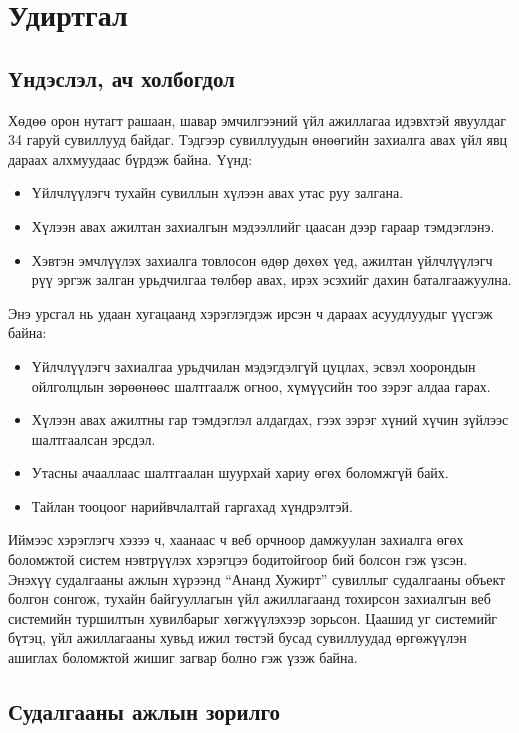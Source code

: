 \chapter{Удиртгал}

\section{Үндэслэл, ач холбогдол}

Хөдөө орон нутагт рашаан, шавар эмчилгээний үйл ажиллагаа идэвхтэй явуулдаг 34 гаруй сувиллууд байдаг. Тэдгээр сувиллуудын өнөөгийн захиалга авах үйл явц дараах алхмуудаас бүрдэж байна. Үүнд:

\begin{itemize}
    \item Үйлчлүүлэгч тухайн сувиллын хүлээн авах утас руу залгана.
    \item Хүлээн авах ажилтан захиалгын мэдээллийг цаасан дээр гараар тэмдэглэнэ.
    \item Хэвтэн эмчлүүлэх захиалга товлосон өдөр дөхөх үед, ажилтан үйлчлүүлэгч рүү эргэж залган урьдчилгаа төлбөр авах, ирэх эсэхийг дахин баталгаажуулна.
\end{itemize}

Энэ урсгал нь удаан хугацаанд хэрэглэгдэж ирсэн ч дараах асуудлуудыг үүсгэж байна:

\begin{itemize}
    \item Үйлчлүүлэгч захиалгаа урьдчилан мэдэгдэлгүй цуцлах, эсвэл хоорондын ойлголцлын зөрөөнөөс шалтгаалж огноо, хүмүүсийн тоо зэрэг алдаа гарах.
    \item Хүлээн авах ажилтны гар тэмдэглэл алдагдах, гээх зэрэг хүний хүчин зүйлээс шалтгаалсан эрсдэл.
    \item Утасны ачааллаас шалтгаалан шуурхай хариу өгөх боломжгүй байх.
    \item Тайлан тооцоог нарийвчлалтай гаргахад хүндрэлтэй.
\end{itemize}

Иймээс хэрэглэгч хэзээ ч, хаанаас ч веб орчноор дамжуулан захиалга өгөх боломжтой систем нэвтрүүлэх хэрэгцээ бодитойгоор бий болсон гэж үзсэн. Энэхүү судалгааны ажлын хүрээнд “Ананд Хужирт” сувиллыг судалгааны объект болгон сонгож, тухайн байгууллагын үйл ажиллагаанд тохирсон захиалгын веб системийн туршилтын хувилбарыг хөгжүүлэхээр зорьсон. Цаашид уг системийг бүтэц, үйл ажиллагааны хувьд ижил төстэй бусад сувиллуудад өргөжүүлэн ашиглах боломжтой жишиг загвар болно гэж үзэж байна.
\section{Судалгааны ажлын зорилго}

